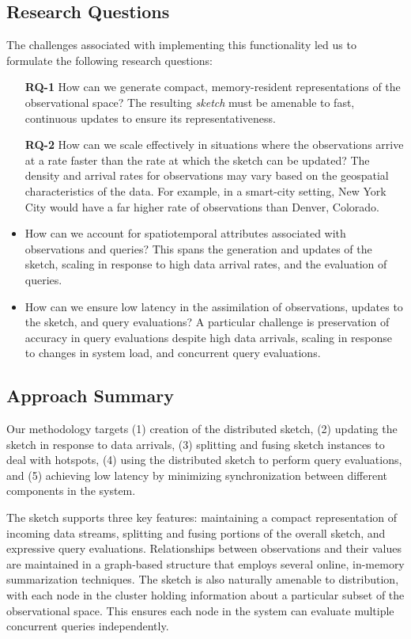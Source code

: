 \subsection{Research Questions}
The challenges associated with implementing this functionality led us to formulate the following research questions:
\begin{itemize}
    \item[\textbf{RQ-1}]   How can we generate compact, memory-resident representations of the observational space? The resulting \emph{sketch} must be amenable to fast, continuous updates to ensure its representativeness.
    \item[\textbf{RQ-2}]   How can we scale effectively in situations where the observations arrive at a rate faster than the rate at which the sketch can be updated? The density and arrival rates for observations may vary based on the geospatial characteristics of the data. For example, in a smart-city setting, New York City would have a far higher rate of observations than Denver, Colorado.
    \item   How can we account for spatiotemporal attributes associated with observations and queries? This spans the generation and updates of the sketch, scaling in response to high data arrival rates, and the evaluation of queries.
    \item   How can we ensure low latency in the assimilation of observations, updates to the sketch, and query evaluations? A particular challenge is preservation of accuracy in query evaluations despite high data arrivals, scaling in response to changes in system load, and concurrent query evaluations.
\end{itemize}

\subsection{Approach Summary}
Our methodology targets (1) creation of the distributed sketch, (2) updating the sketch in response to data arrivals, (3) splitting and fusing sketch instances to deal with hotspots, (4) using the distributed sketch to perform query evaluations, and (5) achieving low latency by minimizing synchronization between different components in the system. 

The sketch supports three key features: maintaining a compact representation of incoming data streams, splitting and fusing portions of the overall sketch, and expressive query evaluations. Relationships between observations and their values are maintained in a graph-based structure that employs several online, in-memory summarization techniques. The sketch is also naturally amenable to distribution, with each node in the cluster holding information about a particular subset of the observational space.  This ensures each node in the system can evaluate multiple concurrent queries independently.

